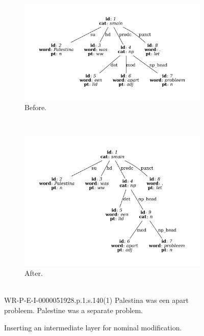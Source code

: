 \begin{figure}
	\centering
	\begin{subfigure}[b]{0.75\textwidth}
		\includegraphics[width=1\textwidth, trim={1.5cm 1.5cm 1.5cm 1.5cm}]{./prebuilt/prenom_before.pdf}
		\caption{Before.}
	\end{subfigure}\\[\midsep]
	\begin{subfigure}[b]{0.75\textwidth}
			\includegraphics[width=1\textwidth,trim={1.5cm 1.5cm 1.5cm 1.5cm}]{./prebuilt/prenom_after.pdf}
		\caption{After.}
	\end{subfigure}\\[\smallsep]
	\lassycap
		{WR-P-E-I-0000051928.p.1.s.140(1)}
		{Palestina was een apart probleem.}
		{Palestine was a separate problem.}
	\caption{Inserting an intermediate layer for nominal modification.}
	\label{figure:prenom}
\end{figure}

